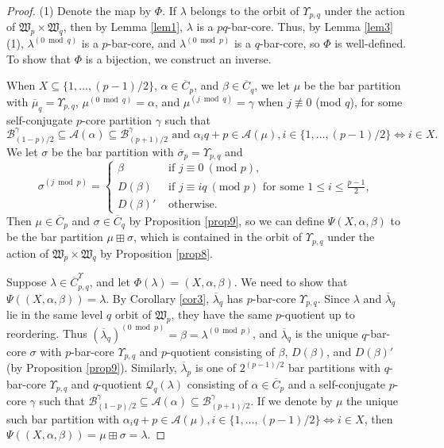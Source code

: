 \documentclass[ALCO, Unicode,published]{cedram}
\newcommand*\nicefrac[2]{#1/#2}
\begin{document}
\begin{proof}
(1) 
Denote the map by $\Phi$. 
If $\lambda$ belongs to the orbit of $\Upsilon_{p,q}$ under the action of $\mathfrak{W}_p\times\mathfrak{W}_q$, then by Lemma \ref{lem1}, $\lambda$ is a $pq$-bar-core. Thus, by Lemma \ref{lem3}(1), $\lambda^{(0\bmod q)}$ is a $p$-bar-core, and $\lambda^{(0\bmod p)}$ is a $q$-bar-core, so $\Phi$ is well-defined. To show that $\Phi$ is a bijection, we construct an inverse. 

When $X\subseteq\{1,\dots,\nicefrac{(p-1)}{2}\}$, $\alpha\in\overline{C}_p$, and $\beta\in\overline{C}_q$, we let $\mu$ be the bar partition with $\overline{\mu}_q=\Upsilon_{p,q}$, $\mu^{(0\bmod q)}=\alpha$, and $\mu^{(j\bmod q)}=\gamma$ when $j\not\equiv0$ (mod $q$), for some self-conjugate $p$-core partition $\gamma$ such that 
$$\mathcal{B}^\gamma_{\nicefrac{(1-p)}{2}}\subseteq\mathcal{A}(\alpha)\subseteq\mathcal{B}^\gamma_{\nicefrac{(p+1)}{2}}\text{ and }\alpha_iq+p\in\mathcal{A}(\mu),i\in\{1,\dots,\nicefrac{(p-1)}{2}\}\Leftrightarrow i\in X.$$ 
We let $\sigma$ be the bar partition with $\overline{\sigma}_p=\Upsilon_{p,q}$ and 
$$\sigma^{(j\bmod p)}=\begin{cases}\beta&\text{ if } j\equiv0\:(\text{mod }p),\\
D(\beta)&\text{ if } j\equiv iq\:(\text{mod }p)\text{ for some }1\leq i\leq\tfrac{p-1}{2},\\
D(\beta)'&\text{ otherwise.}\end{cases}$$ 
Then $\mu\in\overline{C}_p$ and $\sigma\in\overline{C}_q$ by Proposition \ref{prop9}, so we can define $\Psi(X,\alpha,\beta)$ to be the bar partition $\mu\boxplus\sigma$, which is contained in the orbit of $\Upsilon_{p,q}$ under the action of $\mathfrak{W}_p\times\mathfrak{W}_q$ by Proposition \ref{prop8}. 

Suppose $\lambda\in\overline{C}^\Upsilon_{p,q}$, and let $\Phi(\lambda)=(X,\alpha,\beta)$. We need to show that $\Psi((X,\alpha,\beta))=\lambda$. By Corollary \ref{cor3}, $\overline{\lambda}_q$ has $p$-bar-core $\Upsilon_{p,q}$. 
Since $\lambda$ and $\overline{\lambda}_q$ lie in the same level $q$ orbit of $\mathfrak{W}_p$, they have the same $p$-quotient up to reordering. 
Thus $(\overline{\lambda}_q)^{(0\bmod p)}=\beta=\lambda^{(0\bmod p)}$, and $\overline{\lambda}_q$ is the unique $q$-bar-core $\sigma$ with $p$-bar-core $\Upsilon_{p,q}$ and $p$-quotient consisting of $\beta$, $D(\beta)$, and $D(\beta)'$ (by Proposition \ref{prop9}). 
Similarly, $\overline{\lambda}_p$ is one of $2^{\nicefrac{(p-1)}{2}}$ bar partitions with $q$-bar-core $\Upsilon_{p,q}$ and $q$-quotient $\mathcal{Q}_q(\lambda)$ consisting of $\alpha\in\overline{C}_p$ and a self-conjugate $p$-core $\gamma$ such that $\mathcal{B}^\gamma_{\nicefrac{(1-p)}{2}}\subseteq\mathcal{A}(\alpha)\subseteq\mathcal{B}^\gamma_{\nicefrac{(p+1)}{2}}$. If we denote by $\mu$ the unique such bar partition with $\alpha_iq+p\in\mathcal{A}(\mu),i\in\{1,\dots,\nicefrac{(p-1)}{2}\}\Leftrightarrow i\in X$, then $\Psi((X,\alpha,\beta))=\mu\boxplus\sigma=\lambda$. 


\end{proof}
\end{document}
